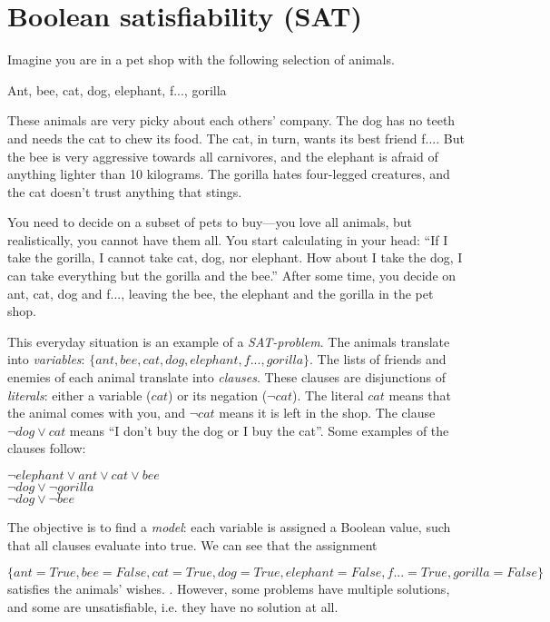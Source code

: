 \section{Boolean satisfiability (SAT)}


Imagine you are in a pet shop with the following selection of animals.

{\center Ant, bee, cat, dog, elephant, f..., gorilla}

These animals are very picky about each others' company. The dog has no teeth and needs the cat to chew its food. The cat, in turn, wants its best friend f.... 
But the bee is very aggressive towards all carnivores, and the elephant is afraid of anything lighter than 10 kilograms. The gorilla hates four-legged creatures, and the cat doesn't trust anything that stings. 

You need to decide on a subset of pets to buy---you love all animals, but realistically, you cannot have them all. You start calculating in your head: ``If I take the gorilla, I cannot take cat, dog, nor elephant. How about I take the dog, I can take everything but the gorilla and the bee.''
After some time, you decide on ant, cat, dog and f..., leaving the bee, the elephant and the gorilla in the pet shop.


This everyday situation is an example of a \emph{SAT-problem}.
The animals translate into \emph{variables}: $\{ant, bee, cat, dog, elephant, f..., gorilla\}$.
The lists of friends and enemies of each animal translate into \emph{clauses}.
These clauses are disjunctions of \emph{literals}: either a variable ($cat$) or its negation ($\neg{}cat$).
The literal $cat$ means that the animal comes with you, 
and $\neg{}cat$ means it is left in the shop. 
The clause $\neg{}dog \vee cat$ means ``I don't buy the dog or I buy the cat''. 
Some examples of the clauses follow:

\begin{center}
$\neg{}elephant \vee ant \vee cat \vee bee$ \\
$\neg{}dog \vee \neg{}gorilla$ \\
$\neg{}dog \vee \neg{}bee$ \\
\end{center}

The objective is to find a \emph{model}: each variable is assigned a Boolean value, such that all clauses evaluate into true. We can see that the assignment 

{\center $\{ant=True, bee=False, cat=True, dog=True, elephant=False, f...=True, gorilla=False\}$ }
\noindent satisfies the animals' wishes.
. However, some problems have multiple solutions, and some are unsatisfiable, i.e. they have no solution at all.


